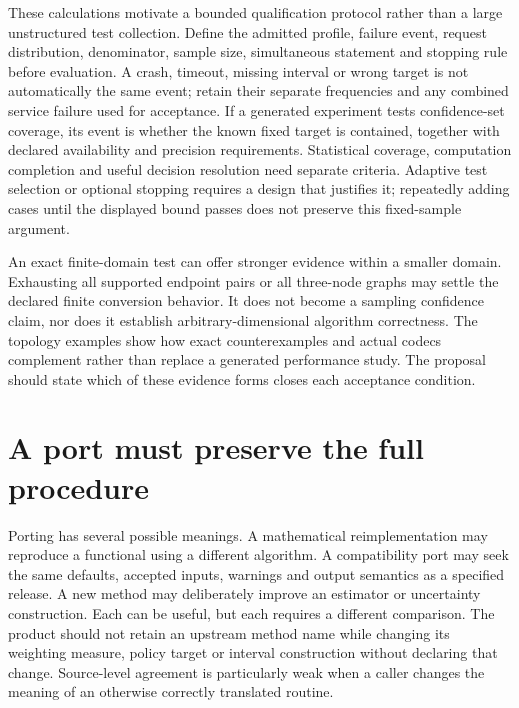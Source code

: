 These calculations motivate a bounded qualification protocol rather than a
large unstructured test collection. Define the admitted profile, failure event,
request distribution, denominator, sample size, simultaneous statement and
stopping rule before evaluation. A crash, timeout, missing interval or wrong
target is not automatically the same event; retain their separate frequencies
and any combined service failure used for acceptance. If a generated experiment
tests confidence-set coverage, its event is whether the known fixed target is
contained, together with declared availability and precision requirements.
Statistical coverage, computation completion and useful decision resolution
need separate criteria. Adaptive test selection or optional stopping requires
a design that justifies it; repeatedly adding cases until the displayed bound
passes does not preserve this fixed-sample argument.

An exact finite-domain test can offer stronger evidence within a smaller
domain. Exhausting all supported endpoint pairs or all three-node graphs
may settle the declared finite conversion behavior. It does not become a
sampling confidence claim, nor does it establish arbitrary-dimensional
algorithm correctness. The topology examples show how exact counterexamples
and actual codecs complement rather than replace a generated performance
study. The proposal should state which of these evidence forms closes each
acceptance condition.
\citep{exec16_topology_exact,exec16_topology_codec}

\section{A port must preserve the full procedure}

Porting has several possible meanings. A mathematical reimplementation may
reproduce a functional using a different algorithm. A compatibility port may
seek the same defaults, accepted inputs, warnings and output semantics as a
specified release. A new method may deliberately improve an estimator or
uncertainty construction. Each can be useful, but each requires a different
comparison. The product should not retain an upstream method name while
changing its weighting measure, policy target or interval construction without
declaring that change. Source-level agreement is particularly weak when a
caller changes the meaning of an otherwise correctly translated routine.


